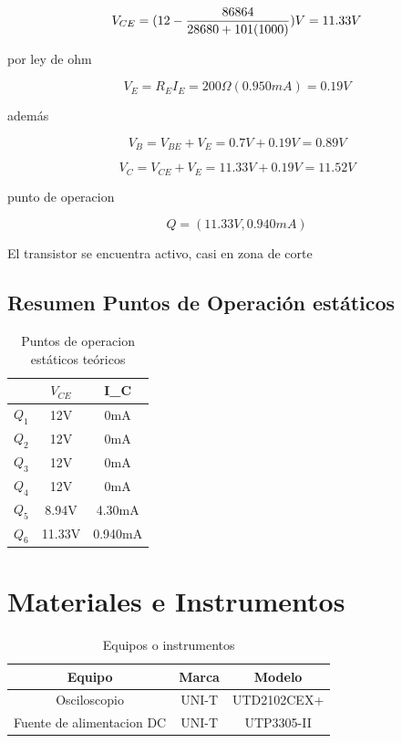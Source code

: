\documentclass[10pt, a4paper]{article}
\begin{document}
    $$V_{CE} = (12 - {86864 \over 28680 +101(1000)})V = 11.33V$$

    por ley de ohm

    $$V_E = R_EI_E = 200\Omega (0.950mA) = 0.19V$$

    además

    $$V_B = V_{BE} + V_E = 0.7V + 0.19V = 0.89V$$

    $$V_C = V_{CE} + V_E = 11.33V + 0.19V = 11.52V$$

    punto de operacion

    \begin{equation}
        Q = (11.33V, 0.940mA)
        \label{Q6}
    \end{equation}

    El transistor se encuentra activo, casi en zona de corte

    \subsection{Resumen Puntos de Operación estáticos}

    \begin{table}[h!]
        \centering
        \caption{Puntos de operacion estáticos teóricos}
        \label{tab:Qt}
        \begin{tabular}{|c|c|c|} \hline
            & $V_{CE}$ & I_C \\ \hline
            $Q_1$ & 12V & 0mA \\
            $Q_2$ & 12V & 0mA \\
            $Q_3$ & 12V & 0mA \\
            $Q_4$ & 12V & 0mA \\
            $Q_5$ & 8.94V & 4.30mA \\
            $Q_6$ & 11.33V & 0.940mA \\ \hline
        \end{tabular}
    \end{table}

    \newpage

    \section{Materiales e Instrumentos}

    \begin{table}[h!]
        \centering
        \caption{Equipos o instrumentos}
        \label{tab:instrumentos}
        \begin{tabular}{|c|c|c|} \hline
            Equipo                    &  Marca&    Modelo   \\ \hline
            Osciloscopio              &  UNI-T & UTD2102CEX+ \\ 
            Fuente de alimentacion DC  &  UNI-T & UTP3305-II  \\ \hline
        \end{tabular}
    \end{table}
\end{document}
